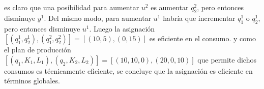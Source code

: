 \begin{enumerate}[a)]
\begin{center}
			\end{center}
		es claro que una posibilidad para aumentar $u^2$ es aumentar $q_{2}^{2}$, pero entonces disminuye $y^1$. Del mismo modo, para aumentar $u^1$ habría que incrementar $q_{1}^{1}$ o $q_{2}^{1}$, pero entonces disminuye $u^1$. Luego la asignación $\left[ \left( q_{1}^{1},q_{2}^{1} \right) ,\left( q_{1}^{2},q_{2}^{2} \right) \right] = \left[ \left( 10, 5\right) ,\left( 0, 15\right) \right]$ es eficiente en el consumo. y como el plan de producción $\left[ \left( q_1, K_1, L_1 \right) ,\left( q_2, K_2, L_2 \right) \right] = \left[ \left( 10, 10, 0\right), \left( 20, 0, 10\right) \right]$ que permite dichos consumos es técnicamente eficiente, se concluye que la asignación es eficiente en términos globales.\\
		

\end{enumerate}
